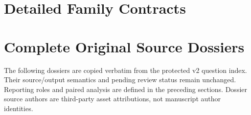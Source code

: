 \documentclass[10pt,letterpaper]{article}
\begin{document}
\section{Detailed Family Contracts}

\clearpage
{\small


}
\section{Complete Original Source Dossiers}
The following dossiers are copied verbatim from the protected v2
question index. Their source/output semantics and pending review status
remain unchanged. Reporting roles and paired analysis are defined in
the preceding sections. Dossier source authors are third-party asset
attributions, not manuscript author identities.

\end{document}
